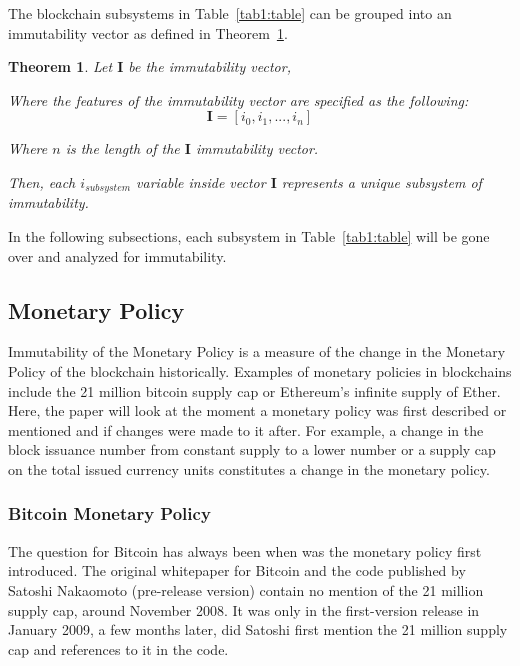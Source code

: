 \documentclass{article}
\newtheorem{theorem}{Theorem}
\begin{document}
The blockchain subsystems in Table~\ref{tab1:table} can be grouped into an immutability vector as defined in Theorem~\ref{th2:theorem}.

\begin{theorem}
Let $\mathbf{I}$ be the immutability vector,

Where the features of the immutability vector are specified as the following: 
\begin{equation}
   \mathbf{I}=\left[i_{0},i_{1},...,i_{n}\right]
   \label{eq2:equation}
\end{equation}

Where $\mathit{n}$ is the length of the $\mathbf{I}$ immutability vector.

Then, each $i_{subsystem}$ variable inside vector $\mathbf{I}$ represents a unique subsystem of immutability.
\label{th2:theorem}
\end{theorem}

In the following subsections, each subsystem in Table~\ref{tab1:table} will be gone over and analyzed for immutability.

\subsection{Monetary Policy}
Immutability of the Monetary Policy is a measure of the change in the Monetary Policy of the blockchain historically. Examples of monetary policies in blockchains include the 21 million bitcoin supply cap or Ethereum’s infinite supply of Ether. Here, the paper will look at the moment a monetary policy was first described or mentioned and if changes were made to it after. For example, a change in the block issuance number from constant supply to a lower number or a supply cap on the total issued currency units constitutes a change in the monetary policy.

\subsubsection{Bitcoin Monetary Policy}
The question for Bitcoin has always been when was the monetary policy first introduced. The original whitepaper for Bitcoin and the code published by Satoshi Nakaomoto (pre-release version) contain no mention of the 21 million supply cap, around November 2008. It was only in the first-version release in January 2009, a few months later, did Satoshi first mention the 21 million supply cap and references to it in the code.
\end{document}
